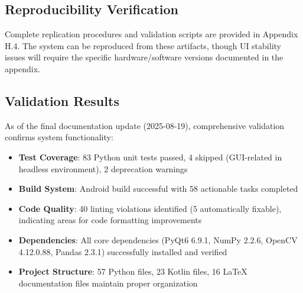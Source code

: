 \subsection{Reproducibility Verification}
Complete replication procedures and validation scripts are provided in Appendix H.4. The system can be reproduced from these artifacts, though UI stability issues will require the specific hardware/software versions documented in the appendix.

\subsection{Validation Results}
As of the final documentation update (2025-08-19), comprehensive validation confirms system functionality:
\begin{itemize}
    \item \textbf{Test Coverage}: 83 Python unit tests passed, 4 skipped (GUI-related in headless environment), 2 deprecation warnings
    \item \textbf{Build System}: Android build successful with 58 actionable tasks completed
    \item \textbf{Code Quality}: 40 linting violations identified (5 automatically fixable), indicating areas for code formatting improvements
    \item \textbf{Dependencies}: All core dependencies (PyQt6 6.9.1, NumPy 2.2.6, OpenCV 4.12.0.88, Pandas 2.3.1) successfully installed and verified
    \item \textbf{Project Structure}: 57 Python files, 23 Kotlin files, 16 LaTeX documentation files maintain proper organization
\end{itemize}

